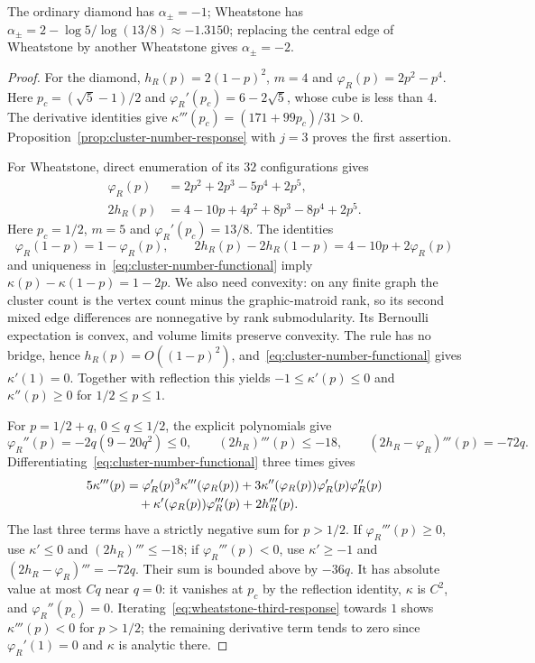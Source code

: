 \begin{example}\label{ex:cluster-number-responses}
The ordinary diamond has $\alpha_\pm=-1$; Wheatstone has
$\alpha_\pm=2-\log5/\log(13/8)\approx-1.3150$; replacing the central edge of Wheatstone by another Wheatstone gives $\alpha_\pm=-2$.
\end{example}
\begin{proof}
For the diamond, $h_R(p)=2(1-p)^2$, $m=4$ and $\varphi_R(p)=2p^2-p^4$.
Here $p_c=(\sqrt5-1)/2$ and $\varphi_R'(p_c)=6-2\sqrt5$, whose cube is less than $4$.
The derivative identities give $\kappa'''(p_c)=(171+99p_c)/31>0$.
Proposition~\ref{prop:cluster-number-response} with $j=3$ proves the first assertion.

For Wheatstone, direct enumeration of its $32$ configurations gives
\begin{align*}
 \varphi_R(p)&=2p^2+2p^3-5p^4+2p^5,\\
 2h_R(p)&=4-10p+4p^2+8p^3-8p^4+2p^5.
\end{align*}
Here $p_c=1/2$, $m=5$ and $\varphi_R'(p_c)=13/8$.
The identities
\[
 \varphi_R(1-p)=1-\varphi_R(p),\qquad
 2h_R(p)-2h_R(1-p)=4-10p+2\varphi_R(p)
\]
and uniqueness in~\eqref{eq:cluster-number-functional} imply
$\kappa(p)-\kappa(1-p)=1-2p$.
We also need convexity: on any finite graph the cluster count is the vertex count minus the graphic-matroid rank, so its second mixed edge differences are nonnegative by rank submodularity.
Its Bernoulli expectation is convex, and volume limits preserve convexity.
The rule has no bridge, hence $h_R(p)=O((1-p)^2)$, and~\eqref{eq:cluster-number-functional} gives $\kappa'(1)=0$.
Together with reflection this yields
$-1\le\kappa'(p)\le0$ and $\kappa''(p)\ge0$ for $1/2\le p\le1$.

For $p=1/2+q$, $0\le q\le1/2$, the explicit polynomials give
\[
 \varphi_R''(p)=-2q(9-20q^2)\le0,\qquad
 (2h_R)'''(p)\le-18,\qquad
 (2h_R-\varphi_R)'''(p)=-72q.
\]
Differentiating~\eqref{eq:cluster-number-functional} three times gives
\begin{align}\label{eq:wheatstone-third-response}
 5\kappa'''(p)
 &=\varphi_R'(p)^3\kappa'''(\varphi_R(p))
   +3\kappa''(\varphi_R(p))\varphi_R'(p)\varphi_R''(p)\notag\\
 &\quad+\kappa'(\varphi_R(p))\varphi_R'''(p)+2h_R'''(p).
\end{align}
The last three terms have a strictly negative sum for $p>1/2$.
If $\varphi_R'''(p)\ge0$, use $\kappa'\le0$ and $(2h_R)'''\le-18$; if $\varphi_R'''(p)<0$, use $\kappa'\ge-1$ and $(2h_R-\varphi_R)'''=-72q$.
Their sum is bounded above by $-36q$.
It has absolute value at most $Cq$ near $q=0$: it vanishes at $p_c$ by the reflection identity, $\kappa$ is $C^2$, and $\varphi_R''(p_c)=0$.
Iterating~\eqref{eq:wheatstone-third-response} towards $1$ shows $\kappa'''(p)<0$ for $p>1/2$; the remaining derivative term tends to zero since $\varphi_R'(1)=0$ and $\kappa$ is analytic there.


\end{proof}
